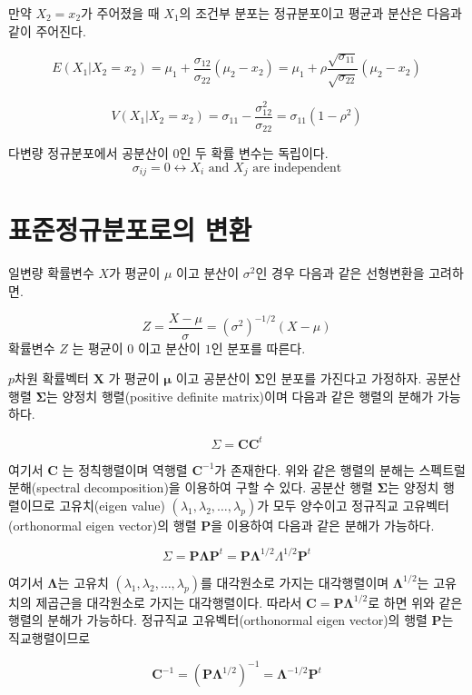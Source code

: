 \documentclass[
  11pt,
  a4paper,
  oneside]{scrbook}
\theoremstyle{definition}
\theoremstyle{plain}
\theoremstyle{definition}
\theoremstyle{definition}
\theoremstyle{remark}
\begin{document}
만약 \(X_2 = x_2\)가 주어졌을 때 \(X_1\)의 조건부 분포는 정규분포이고
평균과 분산은 다음과 같이 주어진다.

\[ 
  E( X_1 |  X_2 =  x_2 ) =  \mu_1 +  \frac{\sigma_{12}}{\sigma_{22}} ( \mu_2 -  x_2)  = \mu_1 +  \rho \frac{\sqrt{\sigma_{11}}}{\sqrt{\sigma_{22}}} ( \mu_2 -  x_2) \]

\[
  V( X_1 |  X_2 =  x_2 )  =  \sigma_{11} - \frac{\sigma^2_{12}}{\sigma_{22}}  = \sigma_{11}(1-\rho^2)
\]

다변량 정규분포에서 공분산이 0인 두 확률 변수는 독립이다.
\[ \sigma_{ij} = 0 \leftrightarrow X_i \text{ and } X_j \text{ are independent} \]

\section{표준정규분포로의
변환}\label{uxd45cuxc900uxc815uxaddcuxbd84uxd3ecuxb85cuxc758-uxbcc0uxd658}

일변량 확률변수 \(X\)가 평균이 \(\mu\) 이고 분산이 \(\sigma^2\)인 경우
다음과 같은 선형변환을 고려하면.

\[ Z = \frac{X - \mu}{\sigma} = (\sigma^2)^{-1/2} (X-\mu) \] 확률변수
\(Z\) 는 평균이 \(0\) 이고 분산이 \(1\)인 분포를 따른다.

\(p\)차원 확률벡터 \(\pmb X\) 가 평균이 \(\pmb \mu\) 이고 공분산이
\(\pmb \Sigma\)인 분포를 가진다고 가정하자. 공분산 행렬
\(\pmb \Sigma\)는 양정치 행렬(positive definite matrix)이며 다음과 같은
행렬의 분해가 가능하다.

\[ \Sigma = \pmb C \pmb C^t \]

여기서 \(\pmb C\) 는 정칙행렬이며 역행렬 \(\pmb C^{-1}\)가 존재한다.
위와 같은 행렬의 분해는 스펙트럴 분해(spectral decomposition)을 이용하여
구할 수 있다. 공분산 행렬 \(\pmb \Sigma\)는 양정치 행렬이므로
고유치(eigen value) \((\lambda_1, \lambda_2,\dots, \lambda_p)\)가 모두
양수이고 정규직교 고유벡터(orthonormal eigen vector)의 행렬 \(\pmb P\)을
이용하여 다음과 같은 분해가 가능하다.

\[ \Sigma = \pmb P \pmb \Lambda \pmb P^t = \pmb P \pmb \Lambda^{1/2} \Lambda^{1/2} \pmb P^t \]

여기서 \(\pmb \Lambda\)는 고유치
\((\lambda_1, \lambda_2,\dots, \lambda_p)\)를 대각원소로 가지는
대각행렬이며 \(\pmb \Lambda^{1/2}\)는 고유치의 제곱근을 대각원소로
가지는 대각행렬이다. 따라서 \(\pmb C = \pmb P \pmb \Lambda^{1/2}\)로
하면 위와 같은 행렬의 분해가 가능하다. 정규직교 고유벡터(orthonormal
eigen vector)의 행렬 \(\pmb P\)는 직교행렬이므로

\[ \pmb C^{-1} =  (\pmb P \pmb \Lambda^{1/2})^{-1} = \pmb \Lambda^{-1/2} \pmb P^t \]
\end{document}
